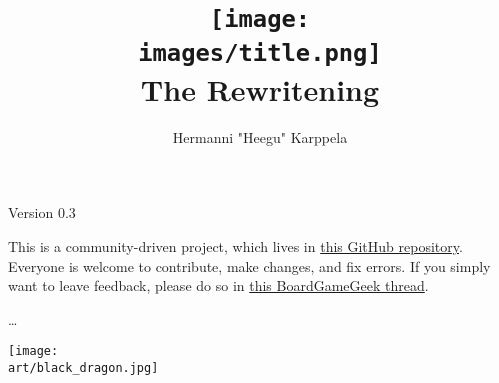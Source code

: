 \documentclass[12pt]{article}
\def\assets{assets}
\def\images{\assets/images}
\def\art{\assets/art}
\begin{document}
\title{\texttt{[image: \\images/title.png]}\\The Rewritening}

\author{Hermanni "Heegu" Karppela}
\maketitle

\begin{center}
Version 0.3
\end{center}

\bigbreak

This is a community-driven project, which lives in \href{https://github.com/Heegu-sama/Homm3BG}{this GitHub repository}.
Everyone is welcome to contribute, make changes, and fix errors.
If you simply want to leave feedback, please do so in \href{https://boardgamegeek.com/thread/3235221/rule-book-rewrite-project}{this BoardGameGeek thread}.

\bigbreak
\ldots

\clearpage

\begin{multicols*}{2}
\tableofcontents
\vspace*{\fill}
\columnbreak
\vspace*{\fill}
\texttt{[image: \\art/black\_dragon.jpg]}
\end{multicols*}

\clearpage
































\end{document}
